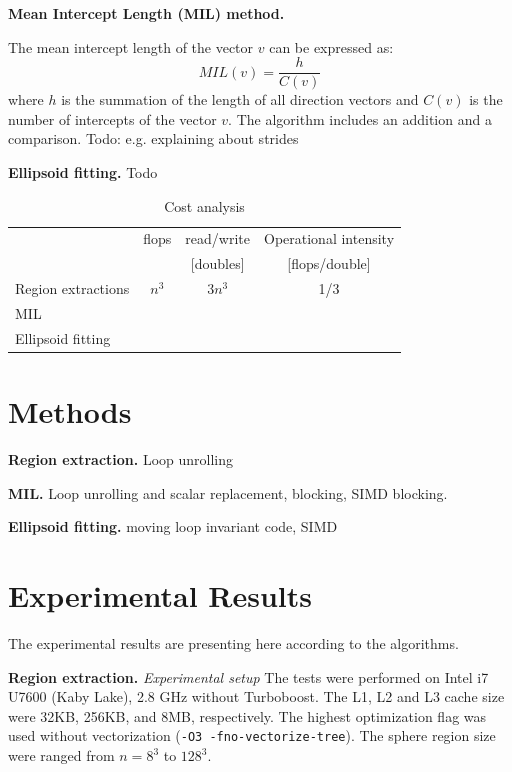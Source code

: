 \documentclass[letterpaper]{article}
\newcommand{\mypar}[1]{{\bf #1.}}
\begin{document}
\mypar{Mean Intercept Length (MIL) method}

The mean intercept length of the vector $v$ can be expressed as:
\begin{equation}
  MIL(v) = \frac{h}{C(v)}
\end{equation}
where $h$ is the summation of the length of all direction vectors and $C(v)$ is the number of intercepts of the vector $v$.
The algorithm includes an addition and a comparison. 
{\color{red}Todo: e.g. explaining about strides}

\mypar{Ellipsoid fitting}  
{\color{red}Todo}

\begin{table}
  \caption{Cost analysis}
  \label{tab:cost}
  \begin{tabular}{l c c c}
    \toprule
     & flops & read/write & Operational intensity\\
     &   & [doubles] & [flops/double]\\
    \midrule
    Region extractions & $n^{3}$ & $3n^{3}$ & 1/3\\
    MIL \\
    Ellipsoid fitting\\
    \bottomrule
  \end{tabular}
\end{table}


\section{Methods}\label{sec:yourmethod}



\mypar{Region extraction} Loop unrolling


\mypar{MIL} Loop unrolling and scalar replacement, blocking, SIMD blocking.

\mypar{Ellipsoid fitting} moving loop invariant code, SIMD


\section{Experimental Results}\label{sec:exp}

The experimental results are presenting here according to the algorithms.

\mypar{Region extraction} \textit{Experimental setup} The tests were performed on Intel i7 U7600 (Kaby Lake), 2.8 GHz without Turboboost. The L1, L2 and L3 cache size were 32KB, 256KB, and 8MB, respectively. The highest optimization flag was used without vectorization (\texttt{-O3 -fno-vectorize-tree}). The sphere region size were ranged from $n=8^{3}$ to $128^{3}$.
\end{document}
